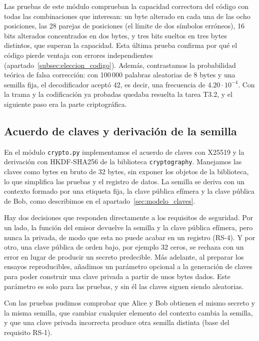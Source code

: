 \documentclass[IB]{TFUOC}%
\begin{document}
Las pruebas de este módulo comprueban la capacidad correctora del código con todas las combinaciones que interesan: un byte alterado en cada una de las ocho posiciones, las 28 parejas de posiciones (el límite de dos símbolos erróneos), 16 bits alterados concentrados en dos bytes, y tres bits sueltos en tres bytes distintos, que superan la capacidad. Esta última prueba confirma por qué el código pierde ventaja con errores independientes (apartado~\ref{subsec:eleccion_codigo}). Además, contrastamos la probabilidad teórica de falsa corrección: con 100\,000 palabras aleatorias de 8 bytes y una semilla fija, el decodificador aceptó 42, es decir, una frecuencia de $4{.}20\cdot10^{-4}$. Con la trama y la codificación ya probadas quedaba resuelta la tarea T3.2, y el siguiente paso era la parte criptográfica.

\subsection{Acuerdo de claves y derivación de la semilla}
\label{subsec:impl_crypto}

En el módulo \texttt{crypto.py} implementamos el acuerdo de claves con X25519 y la derivación con HKDF-SHA256 de la biblioteca \texttt{cryptography}. Manejamos las claves como bytes en bruto de 32 bytes, sin exponer los objetos de la biblioteca, lo que simplifica las pruebas y el registro de datos. La semilla se deriva con un contexto formado por una etiqueta fija, la clave pública efímera y la clave pública de Bob, como describimos en el apartado~\ref{sec:modelo_claves}.

Hay dos decisiones que responden directamente a los requisitos de seguridad. Por un lado, la función del 
emisor devuelve la semilla y la clave pública efímera, pero nunca la privada, de modo que esta no 
puede acabar en un registro (RS-4). Y por otro, una clave pública de orden bajo, por ejemplo 32 ceros, 
se rechaza con un error en lugar de producir un secreto predecible. Más adelante, al preparar los ensayos reproducibles, añadimos un parámetro opcional a la generación de claves para poder construir una clave privada a partir de unos bytes dados. Este parámetro es solo para las pruebas, y sin él las claves siguen siendo aleatorias.

Con las pruebas pudimos comprobar que Alice y Bob obtienen el mismo secreto y la misma semilla, que cambiar cualquier elemento del contexto cambia la 
semilla, y que una clave privada incorrecta produce otra semilla distinta (base del requisito RS-1).
\end{document}
